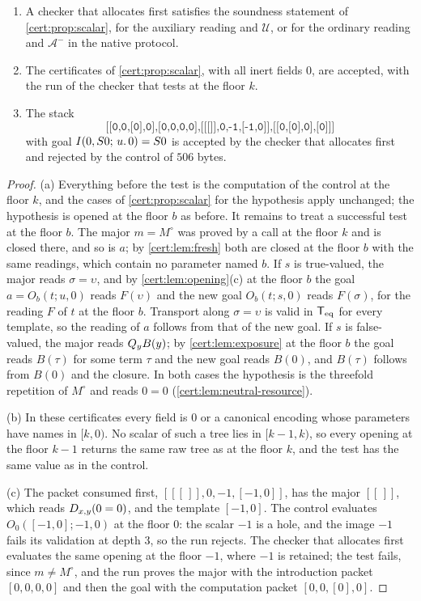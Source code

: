 \begin{proposition}\label{cert:prop:context-first}
\begin{enumerate}[label=(\alph*)]
\item A checker that allocates first satisfies the soundness statement of
\cref{cert:prop:scalar}, for the auxiliary reading and $\mathcal U$, or for the
ordinary reading and $\mathcal A^{-}$ in the native protocol.
\item The certificates of \cref{cert:prop:scalar}, with all inert fields $0$,
are accepted, with the run of the checker that tests at the floor $k$.
\item The stack
\[
\texttt{[[0,0,[0],0],[0,0,0,0],[[[]],0,-1,[-1,0]],[[0,[0],0],[0]]]}
\]
with goal $I(0,S 0;\,u.\,0)=S 0$ is accepted by the checker that
allocates first and rejected by the control of $506$ bytes.
\end{enumerate}
\end{proposition}
\begin{proof}
(a) Everything before the test is the computation of the control at the floor
$k$, and the cases of \cref{cert:prop:scalar} for the hypothesis apply
unchanged; the hypothesis is opened at the floor $b$ as before. It remains to
treat a successful test at the floor $b$. The major $m=M^{\circ}$ was proved by
a call at the floor $k$ and is closed there, and so is $a$; by
\cref{cert:lem:fresh} both are closed at the floor $b$ with the same readings,
which contain no parameter named $b$. If $s$ is true-valued, the major reads
$\sigma=\upsilon$, and by \cref{cert:lem:opening}(c) at the floor $b$ the goal
$a=O_b(t;u,0)$ reads $F(\upsilon)$ and the new goal $O_b(t;s,0)$ reads
$F(\sigma)$, for the reading $F$ of $t$ at the floor $b$. Transport along
$\sigma=\upsilon$ is valid in $\mathsf{T}_{\mathrm{eq}}$ for every template, so the reading of $a$
follows from that of the new goal. If $s$ is false-valued, the major reads
$Q_{y}B(y)$; by \cref{cert:lem:exposure} at the floor $b$ the goal reads
$B(\tau)$ for some term $\tau$ and the new goal reads $B(0)$, and $B(\tau)$
follows from $B(0)$ and the closure. In both cases the hypothesis is the
threefold repetition of $M^{\circ}$ and reads $0=0$
(\cref{cert:lem:neutral-resource}).

(b) In these certificates every field is $0$ or a canonical encoding whose
parameters have names in $[k,0)$. No scalar of such a tree lies in $[k-1,k)$,
so every opening at the floor $k-1$ returns the same raw tree as at the floor
$k$, and the test has the same value as in the control.

(c) The packet consumed first, $[[[\,]],0,-1,[-1,0]]$, has the major
$[[\,]]$, which reads $D_{x,y}(0=0)$, and the template $[-1,0]$. The control evaluates $O_0([-1,0];-1,0)$ at the floor
$0$: the scalar $-1$ is a hole, and the image $-1$ fails its validation at
depth $3$, so the run rejects. The checker that allocates first evaluates the
same opening at the floor $-1$, where $-1$ is retained; the test fails, since
$m\neq M^{\circ}$, and the run proves the major with the introduction packet
$[0,0,0,0]$ and then the goal with the computation packet $[0,0,[0],0]$.
\end{proof}

